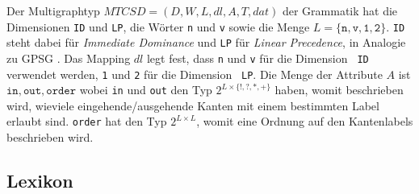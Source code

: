 Der Multigraphtyp $\mathit{MTCSD} = (D,W,L,\mathit{dl},A,T,\mathit{dat})$ der Grammatik hat die
Dimensionen {\tt ID} und {\tt LP}, die W\"orter {\tt n} und {\tt v}
sowie die Menge $L=\{\mathtt{n},\mathtt{v},\mathtt{1},\mathtt{2}\}$.  {\tt ID} steht dabei f\"ur
\emph{Immediate Dominance} und {\tt LP} f\"ur \emph{Linear
Precedence}, in Analogie zu GPSG \cite{GazdarEtal85}.  Das Mapping
$\mathit{dl}$ legt fest, dass {\tt n} und {\tt v} f\"ur die Dimension {\tt
ID} verwendet werden, {\tt 1} und {\tt 2} f\"ur die Dimension {\tt
LP}. Die Menge der Attribute $A$ ist ${\mathtt{in},\mathtt{out},\mathtt{order}}$ wobei {\tt in} und
{\tt out} den Typ $2^{L\times\{!,?,*,+\}}$ haben, womit beschrieben
wird, wieviele eingehende/ausgehende Kanten mit einem bestimmten Label
erlaubt sind.  {\tt order} hat den Typ $2^{L\times L}$, womit eine
Ordnung auf den Kantenlabels beschrieben wird.

\subsection{Lexikon}
 

